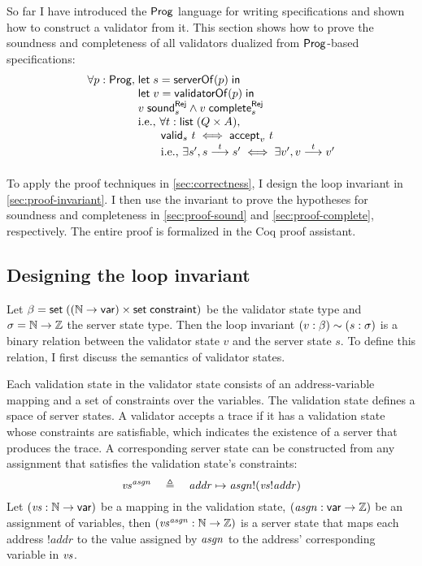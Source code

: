 So far I have introduced the $\mathsf{Prog}$ language for writing specifications and
shown how to construct a validator from it.  This section shows how to prove the
soundness and completeness of all validators dualized from $\mathsf{Prog}$-based
specifications:
\[\begin{array}{r@{\;}l}
\forall p:\Prog,&\letin{s}{\serverOf(p)}\\
&\letin{v}{\validatorOf(p)}\\
&\rejSound v s\wedge\rejComplete v s\\
&\ie\text{, }\forall t:\List(Q\times A),\\
&\qquad\valid s t\iff\accepts v t\\
&\qquad\ie\text{, }\exists s',\behaves s t s'\iff\exists v',\behaves v t v'
\end{array}\]

To apply the proof techniques in \autoref{sec:correctness}, I design the loop
invariant in \autoref{sec:proof-invariant}.  I then use the invariant to prove
the hypotheses for soundness and completeness in \autoref{sec:proof-sound}
and \autoref{sec:proof-complete}, respectively.  The entire proof is formalized
in the Coq proof assistant.

\subsection{Designing the loop invariant}
\label{sec:proof-invariant}
Let $\beta=\mathsf{set}\;((\mathbb N\to\mathsf{var})\times\mathsf{set}\;\mathsf{constraint})$ be the validator state type
and $\sigma=\mathbb N\to\mathbb Z$ the server state type.  Then the loop invariant
$(v:\beta)\sim (s:\sigma)$ is a binary relation between the validator
state $v$ and the server state $s$.  To define this relation, I first discuss
the semantics of validator states.

Each validation state in the validator state consists of an address-variable
mapping and a set of constraints over the variables.  The validation state
defines a space of server states.  A validator accepts a trace if it has a
validation state whose constraints are satisfiable, which indicates the
existence of a server that produces the trace.  A corresponding server state can
be constructed from any assignment that satisfies the validation state's
constraints:
\[\mathit{vs}^{\mathit{asgn}}\quad\triangleq\quad \mathit{addr}\mapsto \mathit{asgn}!(\mathit{vs}!\mathit{addr})\]
Let $(\mathit{vs}:\mathbb N\to\mathsf{var})$ be a mapping in the validation state,
$(\mathit{asgn}:\mathsf{var}\to\mathbb Z)$ be an assignment of variables, then
$(\mathit{vs}^{\mathit{asgn}}:\mathbb N\to\mathbb Z)$ is a server state that maps each address
$!\mathit{addr}$ to the value assigned by $\mathit{asgn}$ to the address' corresponding
variable in $\mathit{vs}$.

